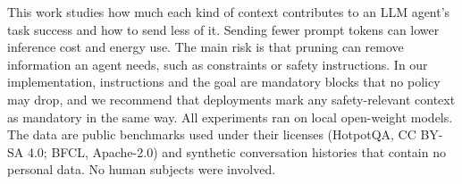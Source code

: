 This work studies how much each kind of context contributes to an LLM agent's task success and how to send less of it.
Sending fewer prompt tokens can lower inference cost and energy use. The main risk is that pruning can remove information
an agent needs, such as constraints or safety instructions. In our implementation, instructions and the goal are
mandatory blocks that no policy may drop, and we recommend that deployments mark any safety-relevant context as
mandatory in the same way. All experiments ran on local open-weight models. The data are public benchmarks used under
their licenses (HotpotQA, CC BY-SA 4.0; BFCL, Apache-2.0) and synthetic conversation histories that contain no personal
data. No human subjects were involved.
